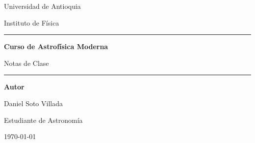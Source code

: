 \documentclass[a4paper,11pt]{report}
\begin{document}
\hypersetup{pageanchor=false}
\begin{titlepage}
    \centering

    \vspace*{2.2cm}

    {\Large Universidad de Antioquia\par}
    \vspace{0.3cm}
    {\large Instituto de Física\par}

    \vspace{2.2cm}

    \rule{\textwidth}{1.2pt}
    \vspace{0.6cm}

    {\Huge\bfseries Curso de Astrofísica Moderna\par}
    \vspace{0.5cm}
    {\LARGE Notas de Clase\par}

    \vspace{0.6cm}
    \rule{\textwidth}{1.2pt}

    \vfill

    {\large\bfseries Autor\par}
    \vspace{0.35cm}
    {\Large Daniel Soto Villada\par}
    \vspace{0.2cm}
    {\large Estudiante de Astronomía\par}

    \vfill

    {\large \today\par}

    \vspace*{1cm}
\end{titlepage}

\hypersetup{pageanchor=true}
\tableofcontents
\clearpage
{}











\end{document}
